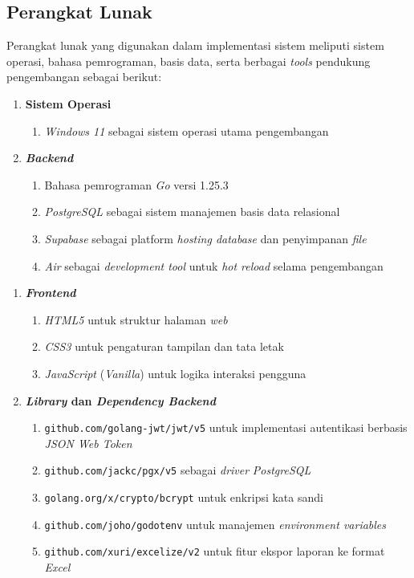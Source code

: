 \subsection{Perangkat Lunak}
Perangkat lunak yang digunakan dalam implementasi sistem meliputi sistem operasi, bahasa pemrograman, basis data, serta berbagai \textit{tools} pendukung pengembangan sebagai berikut:
\begin{enumerate}
    \item \textbf{Sistem Operasi}
    \begin{enumerate}[label=(\alph*)]
        \item \textit{Windows 11} sebagai sistem operasi utama pengembangan
    \end{enumerate}
    \item \textbf{\textit{Backend}}
    \begin{enumerate}[label=(\alph*)]
        \item Bahasa pemrograman \textit{Go} versi 1.25.3
        \item \textit{PostgreSQL} sebagai sistem manajemen basis data relasional
        \item \textit{Supabase} sebagai platform \textit{hosting database} dan penyimpanan \textit{file}
        \item \textit{Air} sebagai \textit{development tool} untuk \textit{hot reload} selama pengembangan
    \end{enumerate}

\end{enumerate}
\newpage
\begin{enumerate}[resume]
    \item \textbf{\textit{Frontend}}
    \begin{enumerate}[label=(\alph*)]
        \item \textit{HTML5} untuk struktur halaman \textit{web}
        \item \textit{CSS3} untuk pengaturan tampilan dan tata letak
        \item \textit{JavaScript} (\textit{Vanilla}) untuk logika interaksi pengguna
    \end{enumerate}
    \item \textbf{\textit{Library} dan \textit{Dependency Backend}}
    \begin{enumerate}[label=(\alph*)]
        \item \texttt{github.com/golang-jwt/jwt/v5} untuk implementasi autentikasi berbasis \textit{JSON Web Token}
        \item \texttt{github.com/jackc/pgx/v5} sebagai \textit{driver} \textit{PostgreSQL}
        \item \texttt{golang.org/x/crypto/bcrypt} untuk enkripsi kata sandi
        \item \texttt{github.com/joho/godotenv} untuk manajemen \textit{environment variables}
        \item \texttt{github.com/xuri/excelize/v2} untuk fitur ekspor laporan ke format \textit{Excel}
    \end{enumerate}
\end{enumerate}
